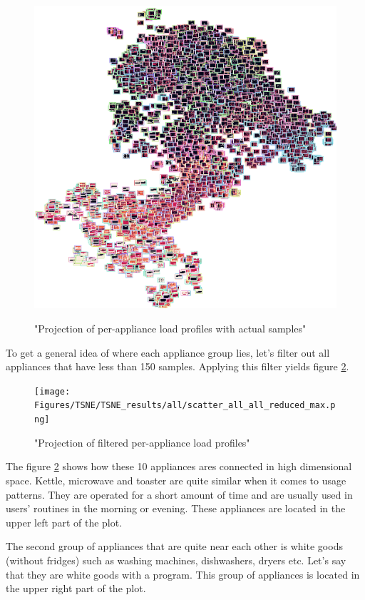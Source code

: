 \begin{figure}[H]
	\centering
	\caption{"Projection of per-appliance load profiles with actual samples"}
	\includegraphics[width=.9\textwidth]{Figures/TSNE/TSNE_results/all/img_scatter_allall_lgimgs.png}
	\label{fig:tsne_papb_img_scatter_all}
\end{figure}

To get a general idea of where each appliance group lies,
let's filter out all appliances that have less than 150 samples.
Applying this filter yields figure \ref{fig:tsne_papb_scatter_all_reduced}.

\begin{figure}[H]
	\centering
	\caption{"Projection of filtered per-appliance load profiles"}
	\texttt{[image: Figures/TSNE/TSNE\_results/all/scatter\_all\_all\_reduced\_max.png]}
	\label{fig:tsne_papb_scatter_all_reduced}
\end{figure}

The figure \ref{fig:tsne_papb_scatter_all_reduced} shows how these 10 appliances ares connected in high dimensional space.
Kettle, microwave and toaster are quite similar when it comes to usage patterns.
They are operated for a short amount of time and are usually used in users' routines in the morning or evening.
These appliances are located in the upper left part of the plot.

The second group of appliances that are quite near each other is white
goods (without fridges) such as washing machines, dishwashers, dryers etc.
Let's say that they are white goods with a program. 
This group of appliances is located in the upper right part of the plot.

